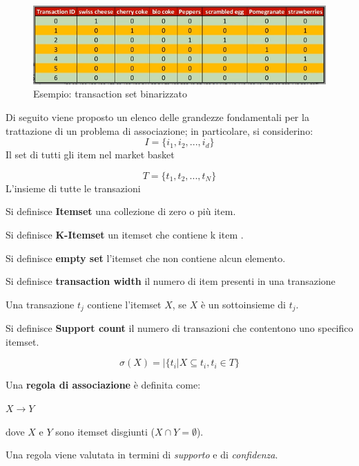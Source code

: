 \begin{figure}[H]
	\centering
	\includegraphics[height=0.25 \linewidth]{association/pict/transaction_set_bin.png}
	\caption{Esempio: transaction set binarizzato}
\end{figure}
Di seguito viene proposto un elenco delle grandezze fondamentali per la trattazione di un problema di associazione; in particolare, si considerino:
\[I = \{i_1, i_2,...,i_d\}\] 
Il set di tutti gli item nel market basket

\[T = \{t_1,t_2,...,t_N\}\] 
L'insieme di tutte le transazioni

\begin{defn}
	Si definisce \textbf{Itemset} una collezione di zero o più item.
\end{defn} 
\begin{defn}
	Si definisce \textbf{K-Itemset} un itemset che contiene k item .
\end{defn}
\begin{defn}
	Si definisce \textbf{empty set} l'itemset che non contiene alcun elemento.
\end{defn}
\begin{defn}
	Si definisce \textbf{transaction width} il numero di item presenti in una transazione
\end{defn}
	 
Una transazione $t_j$ contiene l'itemset $X$, se $X$ è un sottoinsieme di $t_j$.

\begin{defn}
	Si definisce \textbf{Support count} il numero di transazioni che contentono uno specifico itemset.

\[ \sigma(X) = |\{t_i | X \subseteq t_i, t_i \in T\} \]
\end{defn}

\begin{defn}
Una \textbf{regola di associazione} è definita come:

$X \rightarrow Y$

dove $X$ e $Y$ sono itemset disgiunti ($X \cap Y = \emptyset$).
\end{defn}
Una regola viene valutata in termini di \textit{supporto} e di \textit{confidenza}.

